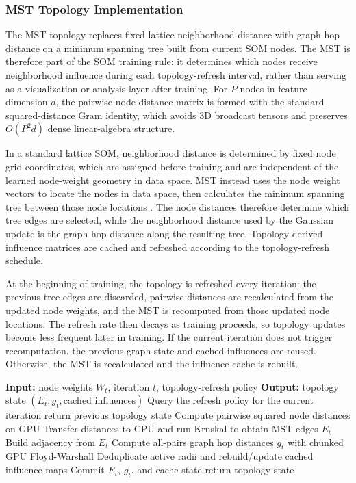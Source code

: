 \documentclass[11pt]{article}
\begin{document}
\subsubsection{MST Topology Implementation}

The MST topology replaces fixed lattice neighborhood distance with graph hop distance on a minimum spanning tree built from current SOM nodes. The MST is therefore part of the SOM training rule: it determines which nodes receive neighborhood influence during each topology-refresh interval, rather than serving as a visualization or analysis layer after training. For $P$ nodes in feature dimension $d$, the pairwise node-distance matrix is formed with the standard squared-distance Gram identity, which avoids 3D broadcast tensors and preserves $O(P^2 d)$ dense linear-algebra structure.

In a standard lattice SOM, neighborhood distance is determined by fixed node grid coordinates, which are assigned before training and are independent of the learned node-weight geometry in data space. MST instead uses the node weight vectors to locate the nodes in data space, then calculates the minimum spanning tree between those node locations \citep{kruskalShortestSpanningSubtree1956}. The node distances therefore determine which tree edges are selected, while the neighborhood distance used by the Gaussian update is the graph hop distance along the resulting tree. Topology-derived influence matrices are cached and refreshed according to the topology-refresh schedule.

At the beginning of training, the topology is refreshed every iteration: the previous tree edges are discarded, pairwise distances are recalculated from the updated node weights, and the MST is recomputed from those updated node locations. The refresh rate then decays as training proceeds, so topology updates become less frequent later in training. If the current iteration does not trigger recomputation, the previous graph state and cached influences are reused. Otherwise, the MST is recalculated and the influence cache is rebuilt.

\begin{algorithm}[H]
\caption{Dynamic MST topology update with refresh-triggered recomputation and cached influence reuse.}
\begin{algorithmic}[1]
\State \textbf{Input:} node weights $W_t$, iteration $t$, topology-refresh policy
\State \textbf{Output:} topology state $(E_t, g_t, \text{cached influences})$
\State Query the refresh policy for the current iteration
\State return previous topology state
\EndIf
\State Compute pairwise squared node distances on GPU
\State Transfer distances to CPU and run Kruskal to obtain MST edges $E_t$
\State Build adjacency from $E_t$
\State Compute all-pairs graph hop distances $g_t$ with chunked GPU Floyd-Warshall
\State Deduplicate active radii and rebuild/update cached influence maps
\State Commit $E_t$, $g_t$, and cache state
\State return topology state
\end{algorithmic}
\end{algorithm}
\end{document}
